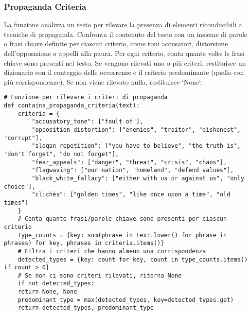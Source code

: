 \documentclass[12pt]{article}
\begin{document}
		\subsubsection{Propaganda Criteria}
La funzione analizza un testo per rilevare la presenza di elementi riconducibili a tecniche di propaganda. Confronta il contenuto del testo con un insieme di parole o frasi chiave definite per ciascun criterio, come toni accusatori, distorsione dell’opposizione o appelli alla paura. Per ogni criterio, conta quante volte le frasi chiave sono presenti nel testo. Se vengono rilevati uno o più criteri, restituisce un dizionario con il conteggio delle occorrenze e il criterio predominante (quello con più corrispondenze). Se non viene rilevato nulla, restituisce `None`.	
	\begin{lstlisting}
# Funzione per rilevare i criteri di propaganda
def contains_propaganda_criteria(text):
	criteria = {
		"accusatory_tone": ["fault of"],
		"opposition_distortion": ["enemies", "traitor", "dishonest", "corrupt"],
		"slogan_repetition": ["you have to believe", "the truth is", "don't forget", "do not forget"],
		"fear_appeals": ["danger", "threat", "crisis", "chaos"],
		"flagwaving": ["our nation", "homeland", "defend values"],
		"black_white_fallacy": ["either with us or against us", "only choice"],
		"clichés": ["golden times", "like once upon a time", "old times"]
	}
	# Conta quante frasi/parole chiave sono presenti per ciascun criterio
	type_counts = {key: sum(phrase in text.lower() for phrase in phrases) for key, phrases in criteria.items()}
	# Filtra i criteri che hanno almeno una corrispondenza
	detected_types = {key: count for key, count in type_counts.items() if count > 0}
	# Se non ci sono criteri rilevati, ritorna None
	if not detected_types:
	return None, None
	predominant_type = max(detected_types, key=detected_types.get)
	return detected_types, predominant_type
	\end{lstlisting}
		
\end{document}
